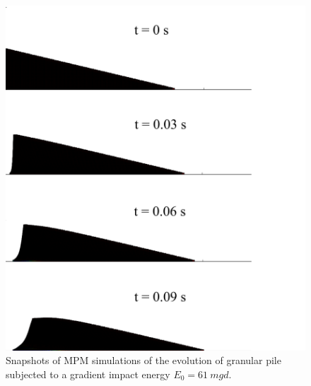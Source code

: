 \clearpage

\begin{figure}[tbph]
\centering
\includegraphics[width=\textwidth]{Uniform_Slope_Profile_200J}
\caption{Snapshots of MPM simulations of the evolution of granular pile 
subjected to a gradient impact energy $E_0 = 61 \ mgd$.}
\label{fig:Uniform_Slope_Profile_200J}
\end{figure}

